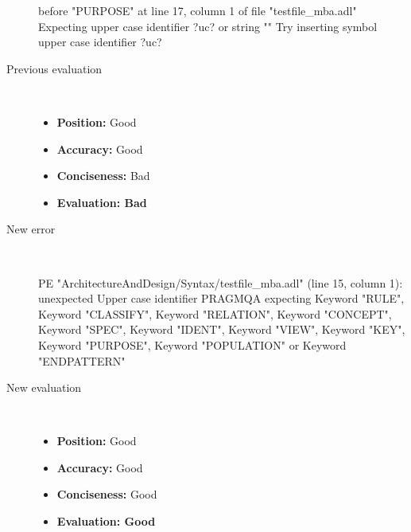 \begin{description}
\begin{haskell}
before "PURPOSE" at line 17, column 1 of file "testfile_mba.adl"
Expecting upper case identifier ?uc? or string ""
Try inserting symbol upper case identifier ?uc?\end{haskell}
  \item[Previous evaluation]~\\
    \begin{itemize}
    \item \textbf{Position:} Good
    \item \textbf{Accuracy:} Good
    \item \textbf{Conciseness:} Bad
    \item \textbf{Evaluation: Bad}
    \end{itemize}
  \item[New error]~\\
\begin{haskell}
PE "ArchitectureAndDesign/Syntax/testfile_mba.adl" (line 15, column 1):
unexpected Upper case identifier PRAGMQA
expecting Keyword "RULE", Keyword "CLASSIFY", Keyword "RELATION", Keyword "CONCEPT", Keyword "SPEC", Keyword "IDENT", Keyword "VIEW", Keyword "KEY", Keyword "PURPOSE", Keyword "POPULATION" or Keyword "ENDPATTERN"\end{haskell}
  \item[New evaluation]~\\
    \begin{itemize}
    \item \textbf{Position:} Good
    \item \textbf{Accuracy:} Good
    \item \textbf{Conciseness:} Good
    \item \textbf{Evaluation: Good}
    \end{itemize}
  \end{description}

\hrulefill

